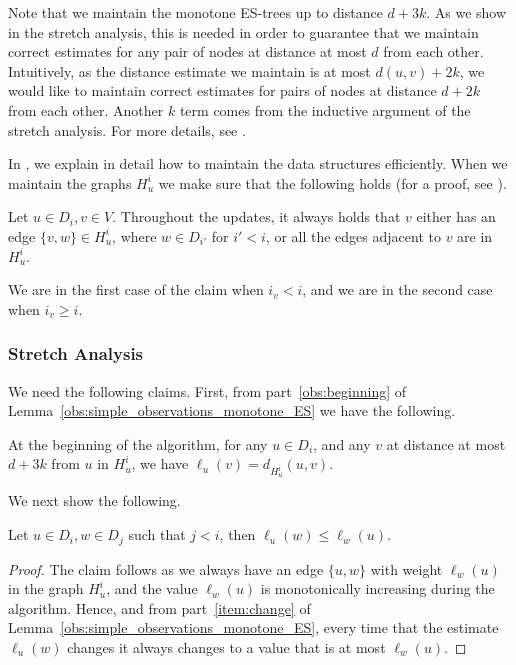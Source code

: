 Note that we maintain the monotone ES-trees up to distance $d+3k$. As we show in the stretch analysis, this is needed in order to guarantee that we maintain correct estimates for any pair of nodes at distance at most $d$ from each other. Intuitively, as the distance estimate we maintain is at most $d(u,v)+2k$, we would like to maintain correct estimates for pairs of nodes at distance $d+2k$ from each other. Another $k$ term comes from the inductive argument of the stretch analysis. For more details, see .

In , we explain in detail how to maintain the data structures efficiently. When we maintain the graphs $H_u^i$ we make sure that the following holds (for a proof, see ). 

\begin{claim}\label{claim_Hui}
Let $u \in D_i, v \in V$. Throughout the updates, it always holds that $v$ either has an edge $\{v,w\} \in H_u^i$, where $w \in D_{i'}$ for $i' < i$, or all the edges adjacent to $v$ are in $H_u^i$. 
\end{claim}

We are in the first case of the claim when $i_v <i$, and we are in the second case when $i_v \geq i$.

\subsubsection{Stretch Analysis} \label{sec_additive_stretch}

We need the following claims. First, from part~\ref{obs:beginning} of Lemma~\ref{obs:simple_observations_monotone_ES} we have the following.

\begin{claim} \label{claim_beginning}
At the beginning of the algorithm, for any $u \in D_i$, and any $v$ at distance at most $d+3k$ from $u$ in $H_u^i$, we have $\ell_u(v)=d_{H_u^i}(u,v).$
\end{claim}

We next show the following. 

\begin{claim} \label{claim_dist_smaller_dom}
Let $u \in D_i, w \in D_j$ such that $j < i$, then $\ell_u(w) \leq \ell_w(u)$. 
\end{claim}

\begin{proof}
The claim follows as we always have an edge $\{u,w\}$ with weight $\ell_w(u)$ in the graph $H_u^i$, and the value $\ell_w(u)$ is monotonically increasing during the algorithm. Hence, and from part~\ref{item:change} of Lemma~\ref{obs:simple_observations_monotone_ES},  every time that the estimate $\ell_u(w)$ changes it always changes to a value that is at most $\ell_w(u)$.
\end{proof}


